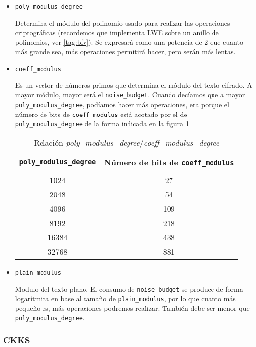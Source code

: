 \begin{itemize}
    \item \verb|poly_modulus_degree|

    Determina el módulo del polinomio usado para realizar las operaciones criptográficas (recordemos que implementa LWE sobre un anillo de polinomios, ver \ref{tag:bfv}). Se expresará como una potencia de 2 que cuanto más grande sea, más operaciones permitirá hacer, pero serán más lentas.

    \item \verb|coeff_modulus|

    Es un vector de números primos que determina el módulo del texto cifrado. A mayor módulo, mayor será el \verb|noise_budget|. Cuando decíamos que a mayor \verb|poly_modulus_degree|, podíamos hacer más operaciones, era porque el número de bits de \verb|coeff_modulus| está acotado por el de \verb|poly_modulus_degree| de la forma indicada en la figura \ref{table:poly_vs_coeff_modulus}

    \begin{table}
        \centering
        \begin{tabular}{  c  c  }
        \verb|poly_modulus_degree|  & Número de bits de \verb|coeff_modulus| \\
        \hline \hline \\
        1024  & 27  \\
        2048  & 54  \\
        4096  & 109 \\
        8192  & 218 \\
        16384 & 438 \\
        32768 & 881
        \end{tabular}
        \caption{Relación \textit{poly\_modulus\_degree}/\textit{coeff\_modulus\_degree}}
        \label{table:poly_vs_coeff_modulus}

    \end{table}

    \item \verb|plain_modulus|

    Modulo del texto plano. El consumo de \verb|noise_budget| se produce de forma logarítmica en base al tamaño de \verb|plain_modulus|, por lo que cuanto más pequeño es, más operaciones podremos realizar. También debe ser menor que \verb|poly_modulus_degree|.
\end{itemize}{}

\subsubsection{CKKS}

